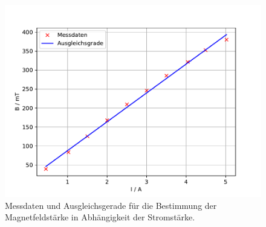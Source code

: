 \begin{figure}
    \centering
    \includegraphics[width=\textwidth,keepaspectratio]{figure/B_plot.pdf}
    \caption{Messdaten und Ausgleichsgerade für die Bestimmung der Magnetfeldstärke in Abhängigkeit der Stromstärke.}
    \label{fig:Magnetfeldstärke}
\end{figure}
\FloatBarrier
